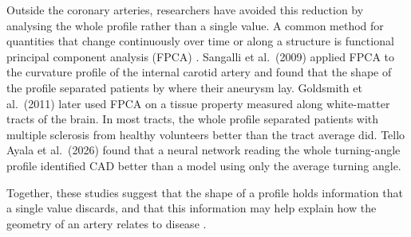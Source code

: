 Outside the coronary arteries, researchers have avoided this reduction by analysing the whole
profile rather than a single value.
A common method for quantities that change continuously over time or along a structure is
functional principal component analysis (FPCA) \cite{ramsay2005fda}.
Sangalli et al.\ (2009) \cite{sangalli2009aneurisk} applied FPCA to the curvature profile of the
internal carotid artery and found that the shape of the profile separated patients by where their
aneurysm lay.
Goldsmith et al.\ (2011) \cite{goldsmith2011pfr} later used FPCA on a tissue property measured
along white-matter tracts of the brain.
In most tracts, the whole profile separated patients with multiple sclerosis from healthy volunteers
better than the tract average did.
Tello Ayala et al.\ (2026) \cite{telloayala2026tortuosity} found that a neural network reading the
whole turning-angle profile identified CAD better than a model using only the average turning
angle.

Together, these studies suggest that the shape of a profile holds information that a single value
discards, and that this information may help explain how the geometry of an artery relates to
disease \cite{sangalli2009aneurisk,goldsmith2011pfr,telloayala2026tortuosity}.